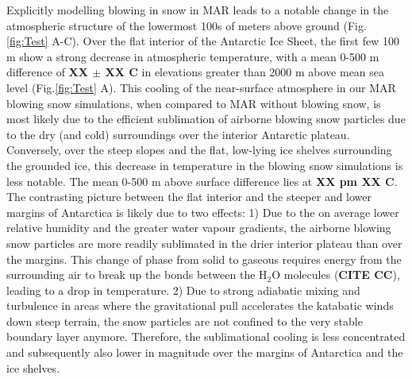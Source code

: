 \documentclass[12pt]{article}
\begin{document}
Explicitly modelling blowing in snow in MAR leads to a notable change in the atmospheric structure of the lowermost 100s of meters above ground (Fig.\ref{fig:Test} A-C). Over the flat interior of the Antarctic Ice Sheet, the first few 100 m show a strong decrease in atmospheric temperature, with a mean 0-500 m difference of \textbf{XX $\pm$ XX \textdegree C} in elevations greater than 2000 m above mean sea level (Fig.\ref{fig:Test} A). This cooling of the near-surface atmosphere in our MAR blowing snow simulations, when compared to MAR without blowing snow, is most likely due to the efficient sublimation of airborne blowing snow particles due to the dry (and cold) surroundings over the interior Antarctic plateau. Conversely, over the steep slopes and the flat, low-lying ice shelves surrounding the grounded ice, this decrease in temperature in the blowing snow simulations is less notable. The mean 0-500 m above surface difference lies at \textbf{XX pm XX \textdegree C}. The contrasting picture between the flat interior and the steeper and lower margins of Antarctica is likely due to two effects: 1) Due to the on average lower relative humidity and the greater water vapour gradients, the airborne blowing snow particles are more readily sublimated in the drier interior plateau than over the margins. This change of phase from solid to gaseous requires energy from the surrounding air to break up the bonds between the H$_2$O molecules (\textbf{CITE CC}), leading to a drop in temperature. 2) Due to strong adiabatic mixing and turbulence in areas where the gravitational pull accelerates the katabatic winds down steep terrain, the snow particles are not confined to the very stable boundary layer anymore. Therefore, the sublimational cooling is less concentrated and subsequently also lower in magnitude over the margins of Antarctica and the ice shelves.
\end{document}
